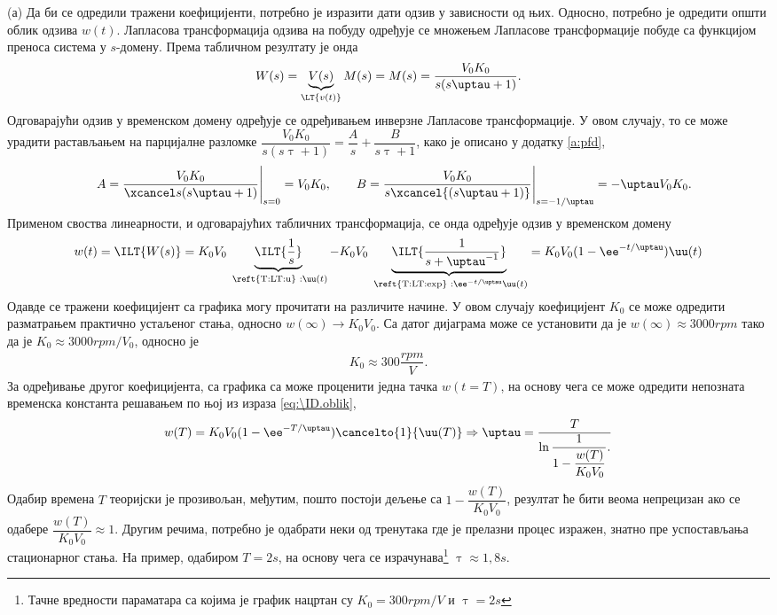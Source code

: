 (а) Да би се одредили тражени коефицијенти, потребно је изразити дати одзив у зависности од њих. Односно, потребно 
је одредити општи облик одзива $w(t)$. 
Лапласова трансформација одзива на побуду одређује се множењем Лапласове трансформације побуде са 
функцијом преноса система у $s$-домену. Према табличном резултату  је онда 
\begin{equation}
    W(s) = \underbrace{V(s)}_{\LT{v(t)}} M(s) = M(s) = \dfrac{V_0 K_0}{s(s\uptau + 1)}.
\end{equation}
Одговарајући одзив у временском домену одређује се одређивањем инверзне Лапласове трансформације. У овом случају, 
то се може урадити растављањем на парцијалне разломке 
$\dfrac{V_0 K_0}{s(s\uptau + 1)} = \dfrac{A}{s} + \dfrac{B}{s\uptau + 1}$, 
како је описано 
у додатку \ref{a:pfd},
\begin{eqnarray}
    && A = \dfrac{V_0 K_0}{\xcancel s (s\uptau + 1)} \Bigg|_{s = 0} = V_0 K_0, \qquad 
    B = \dfrac{V_0 K_0}{ s \xcancel{(s\uptau + 1)}} \Bigg|_{s = -1/\uptau} = -\uptau 
    V_0 K_0.
\end{eqnarray}
Применом своства линеарности, и одговарајућих табличних трансформација, се онда одређује одзив у временском 
домену
\begin{equation}
    w(t) = \ILT{W(s)} = K_0 V_0 \underbrace{\ILT{ \dfrac{1}{s} }}_{\text{ \reft{T:LT:u} } : \uu(t)} 
    - K_0 V_0 \underbrace{\ILT{\dfrac{1}{s + \uptau^{-1}}}}_{\text{ \reft{T:LT:exp} } : \ee^{-t/\uptau} \uu(t) }
    = K_0 V_0 (1 - \ee^{-t/\uptau}) \uu(t) \label{eq:\ID.oblik}
\end{equation}
Одавде се тражени коефицијент са графика могу прочитати на различите начине. У овом случају коефицијент $K_0$ се 
може одредити разматрањем практично устаљеног стања, односно $w(\infty) \to K_0 V_0$. Са датог дијаграма може  
се установити да је $w(\infty) \approx 3000\unit{rpm}$ тако да је $K_0 \approx 3000\unit{rpm}/V_0$, односно је 
\begin{eqnarray}
    K_0 \approx 300\unit{\dfrac{rpm}{V}}.
\end{eqnarray}
За одређивање другог коефицијента, са графика са може проценити једна тачка 
$w(t = T)$, на основу чега се може одредити непозната временска константа
решавањем по њој из израза \eqref{eq:\ID.oblik},
\begin{eqnarray}
    w(T) = K_0V_0(1 - \ee^{-T/\uptau}) \cancelto{1}{\uu(T)} \Rightarrow
    \uptau = \dfrac{T}{
        \ln \dfrac{1}{1 - \dfrac{w(T)}{K_0 V_0}}.
    }
\end{eqnarray}
Одабир времена $T$ теоријски је прозивољан, међутим, пошто постоји дељење са 
$1 - \dfrac{w(T)}{K_0 V_0}$, резултат ће бити веома непрецизан ако се одабере $\dfrac{w(T)}{K_0 V_0} \approx 1$. Другим речима, 
потребно је одабрати неки од тренутака где је прелазни процес изражен, знатно пре успостављања стационарног стања. 
На пример, одабиром $T = 2\unit{s}$, на основу чега се израчунава\footnote{Тачне вредности параматара 
са којима је график нацртан су $K_0 = 300\unit{rpm/V}$ и $\uptau = 2\unit{s}$} $\uptau \approx 1,8\unit{s}$. 

